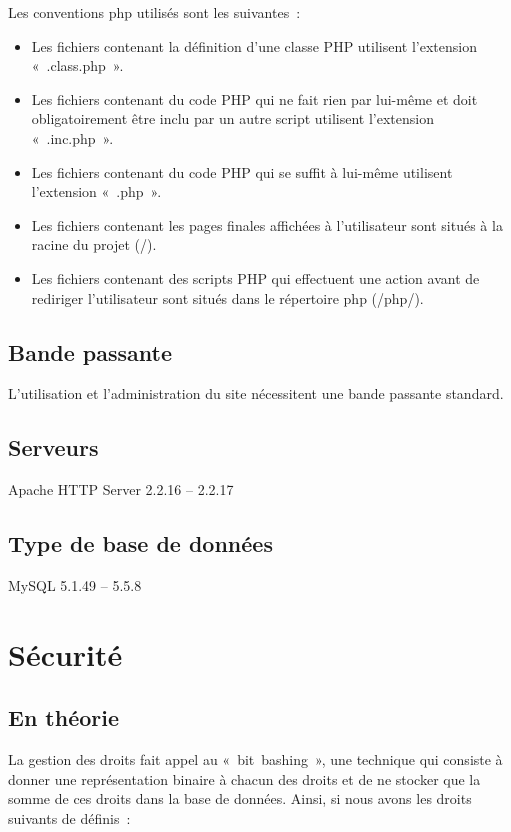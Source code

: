 \documentclass[letter, 11pt]{report}
\begin{document}
Les conventions php utilisés sont les suivantes~:

\begin{itemize}
	\item Les fichiers contenant la définition d'une classe PHP utilisent l'extension «~.class.php~».
	\item Les fichiers contenant du code PHP qui ne fait rien par lui-même et doit obligatoirement être inclu par un autre script utilisent l'extension «~.inc.php~».
	\item Les fichiers contenant du code PHP qui se suffit à lui-même utilisent l'extension «~.php~».
	\item Les fichiers contenant les pages finales affichées à l'utilisateur sont situés à la racine du projet (/).
	\item Les fichiers contenant des scripts PHP qui effectuent une action avant de rediriger l'utilisateur sont situés dans le répertoire php (/php/).
\end{itemize}

\subsection{Bande passante}
L'utilisation et l'administration du site nécessitent une bande passante standard.

\subsection{Serveurs}
Apache HTTP Server 2.2.16 -- 2.2.17

\subsection{Type de base de données}
MySQL 5.1.49 -- 5.5.8

\section{Sécurité}
\label{sec:sécurité}

\subsection{En théorie}

La gestion des droits fait appel au «~bit~bashing~», une technique qui consiste à donner une représentation binaire à chacun des droits et de ne stocker que la somme de ces droits dans la base de données. Ainsi, si nous avons les droits suivants de définis~:
\end{document}

